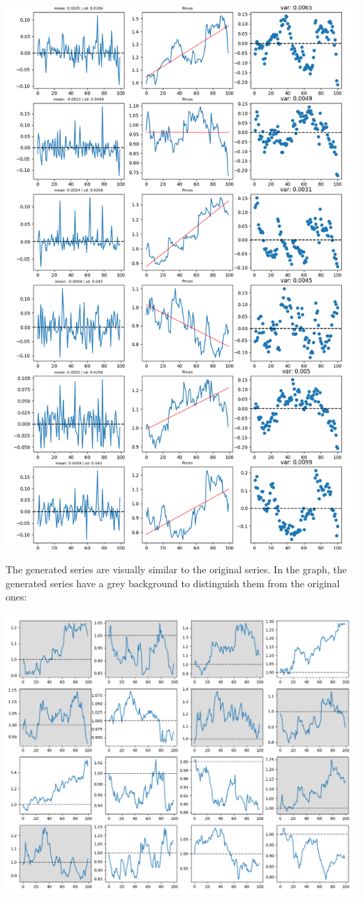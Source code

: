 \documentclass{article}
\begin{document}
    \begin{center}
        \includegraphics[scale=0.5]{imgs/riccardo/results_reduced.png}
    \end{center}
    \newpage
    The generated series are visually similar to the original series. In the graph, the generated series have a grey background to distinguish them from the original ones:
    \begin{center}
        \includegraphics[scale=0.5]{imgs/riccardo/series_comparison_README.png}
    \end{center}
\end{document}
